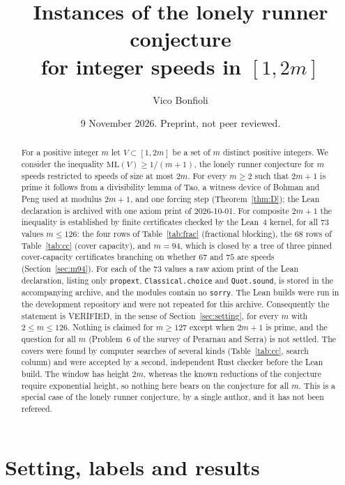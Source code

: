 \documentclass[11pt]{article}
\title{Instances of the lonely runner conjecture\\for integer speeds in $[1,2m]$}
\author{Vico Bonfioli}
\date{9 November 2026. Preprint, not peer reviewed.}
\theoremstyle{remark}
\newcommand{\ML}{\mathrm{ML}}
\begin{document}
\maketitle

\begin{abstract}
For a positive integer $m$ let $V\subset[1,2m]$ be a set of $m$ distinct positive integers. We consider the inequality $\ML(V)\ge 1/(m+1)$, the lonely runner conjecture for $m$ speeds restricted to speeds of size at most $2m$. For every $m\ge2$ such that $2m+1$ is prime it follows from a divisibility lemma of Tao, a witness device of Bohman and Peng used at modulus $2m+1$, and one forcing step (Theorem~\ref{thm:D}); the Lean declaration is archived with one axiom print of 2026-10-01. For composite $2m+1$ the inequality is established by finite certificates checked by the Lean~4 kernel, for all $73$ values $m\le126$: the four rows of Table~\ref{tab:frac} (fractional blocking), the $68$ rows of Table~\ref{tab:cc} (cover capacity), and $m=94$, which is closed by a tree of three pinned cover-capacity certificates branching on whether $67$ and $75$ are speeds (Section~\ref{sec:m94}). For each of the $73$ values a raw axiom print of the Lean declaration, listing only \texttt{propext}, \texttt{Classical.choice} and \texttt{Quot.sound}, is stored in the accompanying archive, and the modules contain no \texttt{sorry}. The Lean builds were run in the development repository and were not repeated for this archive. Consequently the statement is VERIFIED, in the sense of Section~\ref{sec:setting}, for every $m$ with $2\le m\le126$. Nothing is claimed for $m\ge127$ except when $2m+1$ is prime, and the question for all $m$ (Problem~6 of the survey of Perarnau and Serra) is not settled. The covers were found by computer searches of several kinds (Table~\ref{tab:cc}, search column) and were accepted by a second, independent Rust checker before the Lean build. The window has height $2m$, whereas the known reductions of the conjecture require exponential height, so nothing here bears on the conjecture for all $m$. This is a special case of the lonely runner conjecture, by a single author, and it has not been refereed.
\end{abstract}

\section{Setting, labels and results}\label{sec:setting}
\end{document}
